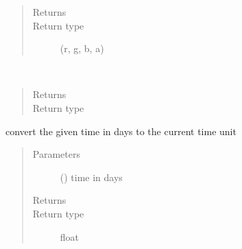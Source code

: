 \documentclass[letterpaper,10pt,english]{sphinxmanual}
\begin{document}
\begin{fulllineitems}
\begin{fulllineitems}
\begin{quote}
\begin{description}
\item[{Returns}] \leavevmode


\item[{Return type}] \leavevmode
(r, g, b, a)

\end{description}\end{quote}

\end{fulllineitems}


\begin{fulllineitems}
\label{\detokenize{Reference:salabim.Environment.current_component}}~\begin{quote}\begin{description}
\item[{Returns}] \leavevmode
{}

\item[{Return type}] \leavevmode
{\hyperref[\detokenize{Reference:salabim.Component}]{}}

\end{description}\end{quote}

\end{fulllineitems}


\begin{fulllineitems}
\label{\detokenize{Reference:salabim.Environment.days}}
convert the given time in days to the current time unit
\begin{quote}\begin{description}
\item[{Parameters}] \leavevmode
{} () \textendash{} time in days

\item[{Returns}] \leavevmode
{}

\item[{Return type}] \leavevmode
float

\end{description}\end{quote}


\end{fulllineitems}
\end{fulllineitems}
\end{document}
